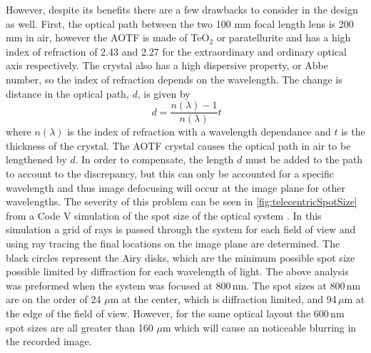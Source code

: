 However, despite its benefits there are a few drawbacks to consider in the design as well. First, the optical path between the two 100 mm focal length lens is 200 mm in air, however the AOTF is made of TeO$_{2}$  or paratellurite and has a high index of refraction of 2.43 and 2.27 for the extraordinary and ordinary optical axis respectively. The crystal also has a high dispersive property, or Abbe number, so the index of refraction depends on the wavelength. The change is distance in the optical path, $d$, is given by
\begin{equation}
    \ d = \frac{n(\lambda)-1}{n(\lambda)}t
    \label{eqn:opticalPathDisplacement}
\end{equation}
where $n(\lambda)$ is the index of refraction with a wavelength dependance and $t$ is the thickness of the crystal. The AOTF crystal causes the optical path in air to be lengthened by $d$. In order to compensate, the length $d$ must be added to the path to account to the discrepancy, but this can only be accounted for a specific wavelength and thus image defocusing will occur at the image plane for other wavelengths. The severity of this problem can be seen in \autoref{fig:telecentricSpotSize} from a Code V simulation of the spot size of the optical system . In this simulation a grid of rays is passed through the system for each field of view and using ray tracing the final locations on the image plane are determined. The black circles represent the Airy disks, which are the minimum possible spot size possible limited by diffraction for each wavelength of light. The above analysis was preformed when the system was focused at 800\,nm. The spot sizes at 800\,nm are on the order of 24 $\mu$m at the center, which is diffraction limited, and 94\,$\mu$m at the edge of the field of view. However, for the same optical layout the 600\,nm spot sizes are all greater than 160 $\mu$m which will cause an noticeable blurring in the recorded image.


